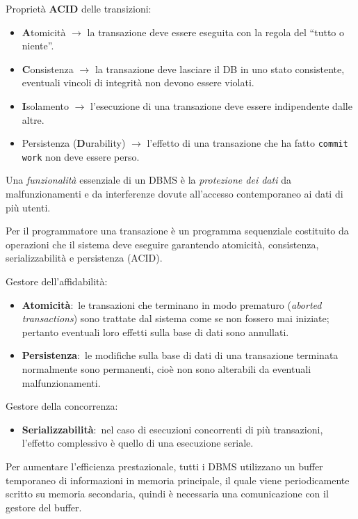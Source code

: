 Proprietà \textbf{ACID} delle transizioni:
\begin{itemize}
	\item \textbf{A}tomicità $\rightarrow$ la transazione deve essere eseguita con la regola del ``tutto o niente''.
	\item \textbf{C}onsistenza $\rightarrow$ la transazione deve lasciare il DB in uno stato consistente, eventuali vincoli di integrità non devono essere violati.
	\item \textbf{I}solamento $\rightarrow$ l'esecuzione di una transazione deve essere indipendente dalle altre.
	\item Persistenza (\textbf{D}urability) $\rightarrow$ l'effetto di una transazione che ha fatto \texttt{commit work} non deve essere perso.
\end{itemize}

\noindent Una \textit{funzionalità} essenziale di un DBMS è la \textit{protezione dei dati} da malfunzionamenti e da interferenze dovute all'accesso contemporaneo ai dati di più utenti.\

Per il programmatore una transazione è un programma sequenziale costi\-tuito da operazioni che il sistema deve eseguire garantendo atomicità, con\-sistenza, serializzabilità e persistenza (ACID).

\noindent Gestore dell'affidabilità:
\begin{itemize}
	\item \textbf{Atomicità}:\ le transazioni che terminano in modo prematuro (\textit{aborted transactions}) sono trattate dal sistema come se non fossero mai iniziate; pertanto eventuali loro effetti sulla base di dati sono annullati.
	\item \textbf{Persistenza}:\ le modifiche sulla base di dati di una transazione terminata normalmente sono permanenti, cioè non sono alterabili da eventuali malfunzionamenti.\
\end{itemize}

\noindent Gestore della concorrenza:
\begin{itemize}
	\item \textbf{Serializzabilità}:\ nel caso di esecuzioni concorrenti di più transazioni, l'effetto complessivo è quello di una esecuzione seriale.
\end{itemize}

\noindent Per aumentare l'efficienza prestazionale, tutti i DBMS utilizzano un buffer temporaneo di informazioni in memoria principale, il quale viene periodicamente scritto su memoria secondaria, quindi è necessaria una comunicazione con il gestore del buffer.\

